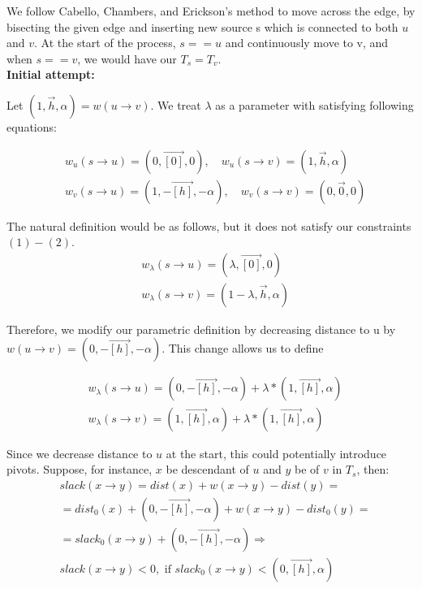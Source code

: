 \documentclass{article}
\begin{document}
We follow Cabello, Chambers, and Erickson's \cite{cabello2013multiple}
method to move across the edge,
by bisecting the given edge and inserting new source s which is connected to
both $u$ and $v$. At the start of the process, $s == u$ and continuously move to
v, and when $s == v$, we would have our $T_s = T_v$. \\

\textbf{Initial attempt:}

Let $(1, \vec{h}, \alpha) = w(u \rightarrow v)$. We treat $\lambda$ as a
parameter with satisfying following equations:

\begin{align}
&w_{u}(s \rightarrow u) = (0, \vec{[0]}, 0), \quad
  w_{u}(s \rightarrow v) = (1, \vec{h}, \alpha) \\
&w_{v}(s \rightarrow u) = (1, -\vec{[h]}, -\alpha), \quad
  w_{v}(s \rightarrow v) = (0, \vec{0}, 0)
\end{align}

The natural definition would be as follows, but it does not satisfy our
constraints $(1)-(2)$.
\begin{align}
&w_{\lambda}(s \rightarrow u) = (\lambda, \vec{[0]}, 0)  \\
&w_{\lambda}(s \rightarrow v) = (1 - \lambda, \vec{h}, \alpha)
\end{align}

Therefore, we modify our parametric definition by decreasing distance to u by
$w(u \rightarrow v) = (0, -\vec{[h]}, -\alpha)$. This change allows us to define

\begin{align}
&w_{\lambda}(s \rightarrow u) = (0, -\vec{[h]}, -\alpha) + 
\lambda * (1, \vec{[h]}, \alpha)  \\
&w_{\lambda}(s \rightarrow v) = (1, \vec{[h]}, \alpha) + 
\lambda * (1, \vec{[h]}, \alpha)
\end{align}

Since we decrease distance to $u$ at the start, this could potentially introduce
pivots. Suppose, for instance, $x$ be descendant of $u$ and $y$ be of $v$ in $T_s$,
then:
\begin{align*}
& slack(x \rightarrow y) = dist(x) + w(x \rightarrow y) - dist(y) = \\
& = dist_0(x) + (0, -\vec{[h]}, -\alpha) + w(x \rightarrow y) - dist_0(y) = \\
& = slack_0(x \rightarrow y) + (0, -\vec{[h]}, -\alpha) \Rightarrow \\
& slack(x \rightarrow y) < 0, \text{ if } slack_0(x \rightarrow y) < 
(0,\vec{[h]},\alpha)
\end{align*}
\end{document}
